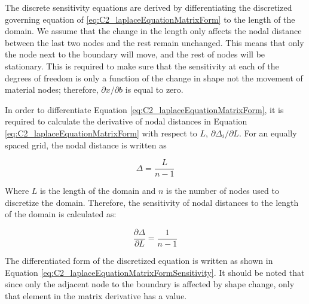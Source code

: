 The discrete sensitivity equations are derived by differentiating the discretized governing equation of \eqref{eq:C2_laplaceEquationMatrixForm} to the length of the domain. We assume that the change in the length only affects the nodal distance between the last two nodes and the rest remain unchanged. This means that only the node next to the boundary will move, and the rest of nodes will be stationary. This is required to make sure that the sensitivity at each of the degrees of freedom is only a function of the change in shape not the movement of material nodes; therefore, $\partial x/\partial b$ is equal to zero.

In order to differentiate Equation  \eqref{eq:C2_laplaceEquationMatrixForm}, it is required to calculate the derivative of nodal distances in Equation \eqref{eq:C2_laplaceEquationMatrixForm} with respect to $L$, $\partial \Delta_i/\partial L$. For an equally spaced grid, the nodal distance is written as

\begin{equation*}
    \Delta = \frac{L}{n - 1}
\end{equation*}

Where $L$ is the length of the domain and $n$ is the number of nodes used to discretize the domain. Therefore, the sensitivity of nodal distances to the length of the domain is calculated as:

\begin{equation}\label{eq:C2_nodeDistanceSensitivity}
    \frac{\partial \Delta}{\partial L} = \frac{1}{n-1}
\end{equation}

The differentiated form of the discretized equation is written as shown in Equation \eqref{eq:C2_laplaceEquationMatrixFormSensitivity}. It should be noted that since only the adjacent node to the boundary is affected by shape change, only that element in the matrix derivative has a value.

